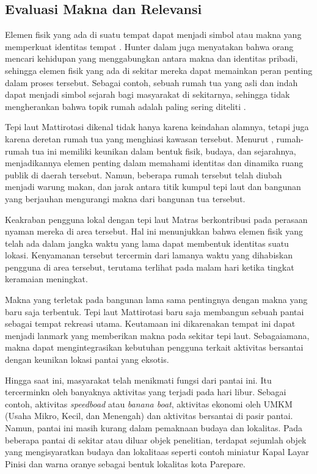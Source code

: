 \documentclass[11pt]{simart} %
\begin{document}
\subsection{Evaluasi Makna dan Relevansi}%
\label{sub:Evaluasi Makna dan Relevansi}

Elemen fisik yang ada di suatu tempat dapat menjadi simbol atau makna yang memperkuat identitas tempat \citep{hull1994}. Hunter dalam \cite{hull1994}  juga menyatakan bahwa orang mencari kehidupan yang menggabungkan antara makna dan identitas pribadi, sehingga elemen fisik yang ada di sekitar mereka dapat memainkan peran penting dalam proses tersebut.
Sebagai contoh, sebuah rumah tua yang asli dan indah dapat menjadi simbol sejarah bagi masyarakat di sekitarnya, sehingga tidak mengherankan bahwa topik rumah adalah paling sering diteliti \citep{hull1994}.

Tepi laut Mattirotasi dikenal tidak hanya karena keindahan alamnya, tetapi juga karena deretan rumah tua yang menghiasi kawasan tersebut. Menurut \cite{iqbal2020}, rumah-rumah tua ini memiliki keunikan dalam bentuk fisik, budaya, dan sejarahnya, menjadikannya elemen penting dalam memahami identitas dan dinamika ruang publik di daerah tersebut.
Namun, beberapa rumah tersebut telah diubah menjadi warung makan, dan jarak antara titik kumpul tepi laut dan bangunan yang berjauhan mengurangi makna dari bangunan tua tersebut.

Keakraban pengguna lokal dengan tepi laut Matras berkontribusi pada perasaan nyaman mereka di area tersebut.
Hal ini menunjukkan bahwa elemen fisik yang telah ada dalam jangka waktu yang lama dapat membentuk identitas suatu lokasi.
Kenyamanan tersebut tercermin dari lamanya waktu yang dihabiskan pengguna di area tersebut, terutama terlihat pada malam hari ketika tingkat keramaian meningkat.

Makna yang terletak pada bangunan lama sama pentingnya dengan makna yang baru saja terbentuk. Tepi laut Mattirotasi baru saja membangun sebuah pantai sebagai tempat rekreasi utama. Keutamaan ini dikarenakan tempat ini dapat menjadi lanmark yang memberikan makna pada sekitar tepi laut.
Sebagaiamana, makna dapat mengintegrasikan kebutuhan pengguna terkait aktivitas bersantai dengan keunikan lokasi pantai yang eksotis.

Hingga saat ini, masyarakat telah menikmati fungsi dari pantai ini. Itu tercerminkn oleh banyaknya aktivitas yang terjadi pada hari libur. Sebagai contoh, aktivitas \textit{speedboad} atau \textit{banana boat}, aktivitas ekonomi oleh UMKM (Usaha Mikro, Kecil, dan Menengah) dan aktivitas bersantai di pasir pantai.
Namun, pantai ini masih kurang dalam pemaknaan budaya dan lokalitas. Pada beberapa pantai di sekitar atau diluar objek penelitian, terdapat sejumlah objek yang mengisyaratkan budaya dan lokalitaas seperti contoh miniatur Kapal Layar Pinisi dan warna oranye sebagai bentuk lokalitas kota Parepare.
\end{document}
